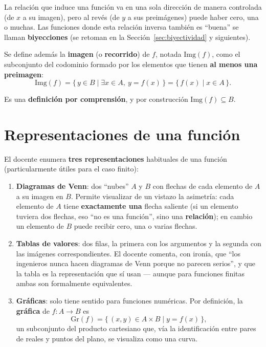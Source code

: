 \documentclass[12pt,a4paper]{article}
\begin{document}
\begin{notebox}
La relación que induce una función va en una sola dirección de manera controlada (de $x$ a su imagen), pero al revés (de $y$ a sus preimágenes) puede haber cero, una o muchas. Las funciones donde esta relación inversa también es ``buena'' se llaman \textbf{biyecciones} (se retoman en la Sección~\ref{sec:biyectividad} y siguientes).
\end{notebox}

Se define además la \textbf{imagen} (o \textbf{recorrido}) de $f$, notada $\mathrm{Img}(f)$, como el subconjunto del codominio formado por los elementos que tienen \textbf{al menos una preimagen}:
$$\mathrm{Img}(f) = \{\, y \in B \mid \exists x \in A,\ y = f(x) \,\} = \{\, f(x) \mid x \in A \,\}.$$

Es una \textbf{definición por comprensión}, y por construcción $\mathrm{Img}(f) \subseteq B$.

\section{Representaciones de una función}

El docente enumera \textbf{tres representaciones} habituales de una función (particularmente útiles para el caso finito):

\begin{enumerate}
  \item \textbf{Diagramas de Venn}: dos ``nubes'' $A$ y $B$ con flechas de cada elemento de $A$ a su imagen en $B$. Permite visualizar de un vistazo la asimetría: cada elemento de $A$ tiene \textbf{exactamente una} flecha saliente (si un elemento tuviera dos flechas, eso ``no es una función'', sino una \textbf{relación}); en cambio un elemento de $B$ puede recibir cero, una o varias flechas.
  \item \textbf{Tablas de valores}: dos filas, la primera con los argumentos y la segunda con las imágenes correspondientes. El docente comenta, con ironía, que ``los ingenieros nunca hacen diagramas de Venn porque no parecen serios'', y que la tabla es la representación que sí usan --- aunque para funciones finitas ambas son formalmente equivalentes.
  \item \textbf{Gráficas}: solo tiene sentido para funciones numéricas. Por definición, la \textbf{gráfica} de $f:A\to B$ es
  $$\mathrm{Gr}(f) = \{\, (x,y) \in A \times B \mid y = f(x) \,\},$$
  un subconjunto del producto cartesiano que, vía la identificación entre pares de reales y puntos del plano, se visualiza como una curva.
\end{enumerate}
\end{document}
